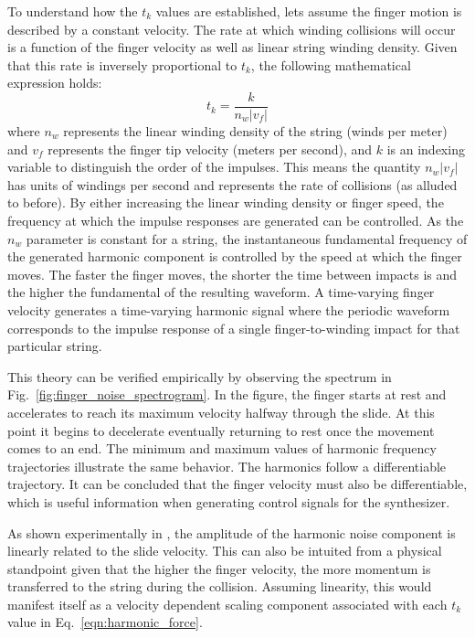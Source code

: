 \documentclass[main.tex]{subfiles}
\begin{document}
To understand how the $t_k$ values are established, lets assume the finger motion is described by a constant velocity. The rate at which winding collisions will occur is a function of the finger velocity as well as linear string winding density. Given that this rate is inversely proportional to $t_k$, the following mathematical expression holds:
\begin{equation}
    t_k = \frac{k}{n_w |v_f|}
    \label{eqn:t_k}
\end{equation}
where $n_w$ represents the linear winding density of the string (winds per meter) and $v_f$ represents the finger tip velocity (meters per second), and $k$ is an indexing variable to distinguish the order of the impulses. This means the quantity $n_w |v_f|$ has units of windings per second and represents the rate of collisions (as alluded to before). By either increasing the linear winding density or finger speed, the frequency at which the impulse responses are generated can be controlled. As the $n_w$ parameter is constant for a string, the instantaneous fundamental frequency of the generated harmonic component is controlled by the speed at which the finger moves. The faster the finger moves, the shorter the time between impacts is and the higher the fundamental of the resulting waveform. A time-varying finger velocity generates a time-varying harmonic signal where the periodic waveform corresponds to the impulse response of a single finger-to-winding impact for that particular string.

This theory can be verified empirically by observing the spectrum in Fig.~\ref{fig:finger_noise_spectrogram}. In the figure, the finger starts at rest and accelerates to reach its maximum velocity halfway through the slide. At this point it begins to decelerate eventually returning to rest once the movement comes to an end. The minimum and maximum values of harmonic frequency trajectories illustrate the same behavior. The harmonics follow a differentiable trajectory. It can be concluded that the finger velocity must also be differentiable, which is useful information when generating control signals for the synthesizer. 

As shown experimentally in , the amplitude of the harmonic noise component is linearly related to the slide velocity. This can also be intuited from a physical standpoint given that the higher the finger velocity, the more momentum is transferred to the string during the collision. Assuming linearity, this would manifest itself as a velocity dependent scaling component associated with each $t_k$ value in Eq.~\ref{eqn:harmonic_force}.
\end{document}
